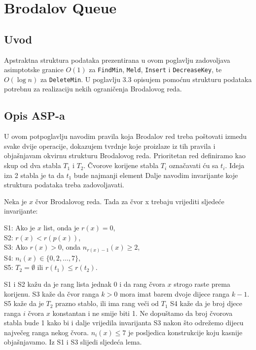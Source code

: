\newenvironment{myindentpar}[1]%
 {\begin{list}{}%
         {\setlength{\leftmargin}{#1}}%
         \item[]%
 }
 {\end{list}}

\chapter{Brodalov Queue}

\section{Uvod}
Apstraktna struktura podataka prezentirana u ovom poglavlju zadovoljava asimptotske granice $O(1)$ za \texttt{FindMin}, \texttt{Meld}, \texttt{Insert} i \texttt{DecreaseKey}, te $O(\log n)$ za \texttt{DeleteMin}.
U poglavlju 3.3 opisujem pomo\'{c}nu strukturu podataka potrebnu za realizaciju nekih ograni\v{c}enja Brodalovog reda.

\section{Opis ASP-a}
U ovom potpoglavlju navodim pravila koja Brodalov red treba po\v{s}tovati izmedu svake dvije operacije, dokazujem tvrdnje koje proizlaze iz tih pravila i obja\v{s}njavam okvirnu strukturu Brodalovog reda.
Prioritetan red definiramo kao skup od dva stabla $T_{1}$ i $T_{2}$.
\v{C}vorove korijene stabla $T_{i}$ ozna\v{c}avati \'{c}u sa $t_{i}$.
Ideja iza 2 stabla je ta da $t_{1}$ bude najmanji element
Dalje navodim invarijante koje struktura podataka treba zadovoljavati.

\begin{defn}\label{S_inv}
  Neka je $x$ \v{c}vor Brodalovog reda. Tada za \v{c}vor x trebaju vrijediti sljede\'{c}e invarijante:
  \begin{myindentpar}{15pt}
    S1: Ako je $x$ list, onda je $r(x) = 0$, \\
    S2: $r(x) < r(p(x))$, \\
    S3: Ako $r(x) > 0$, onda $n_{r(x)-1}(x) \ge 2$, \\
    S4: $n_{i}(x) \in \{0,2,\ldots,7\}$, \\
    S5: $T_{2} = \emptyset $ \bigskip ili \bigskip $r(t_{1}) \le r(t_{2})$.
  \end{myindentpar}
\end{defn}

S1 i S2 ka\v{z}u da je rang lista jednak 0 i da rang \v{c}vora $x$ strogo raste prema korijenu.
S3 ka\v{z}e da \v{c}vor ranga $k > 0$ mora imat barem dvoje dijece ranga $k - 1$.
S5 ka\v{z}e da je $T_{2}$ prazno stablo, ili ima rang ve\v{c}i od $T_{1}$
S4 ka\v{z}e da je broj djece ranga $i$ \v{c}vora $x$ konstantan i ne smije biti 1.
Ne dopu\v{s}tamo da broj \v{c}vorova stabla bude 1 kako bi i dalje vrijedila invarijanta S3 nakon \v{s}to odre\v{z}emo dijecu najve\v{c}eg ranga nekog \v{c}vora. $n_{i}(x) \le 7$ je posljedica konstrukcije koju kasnije obja\v{s}njavamo.
Iz S1 i S3 slijedi sljede\'{c}a lema.

